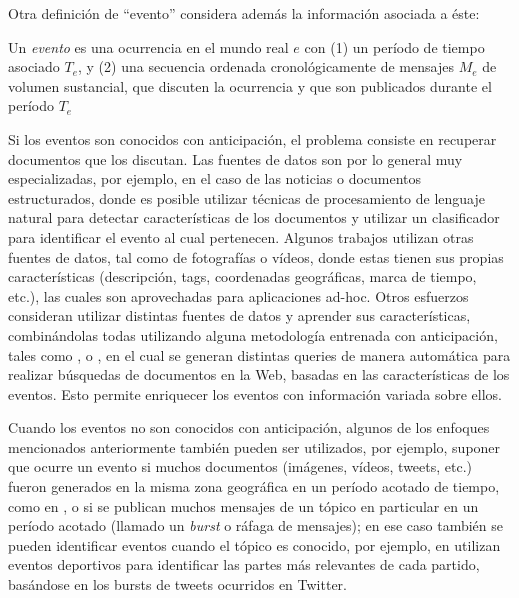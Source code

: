    Otra definición de ``evento'' considera además la información
   asociada a éste\cite{allan2002topic}:

   \begin{defn} Un \emph{evento} es una ocurrencia en el mundo real $e$ con
   (1) un período de tiempo asociado $T_e$, y (2) una secuencia
   ordenada cronológicamente de mensajes $M_e$ de volumen sustancial,
   que discuten la ocurrencia y que son publicados durante el período
   $T_e$ \end{defn}

   Si los eventos son conocidos con anticipación, el problema consiste
   en recuperar documentos que los discutan. Las fuentes de datos son
   por lo general muy especializadas, por ejemplo, en el caso de las
   noticias\cite{Diakopoulos:2012:FAS:2208276.2208409} o documentos
   estructurados, donde es posible utilizar técnicas de procesamiento
   de lenguaje natural para detectar características de los documentos
   y utilizar un clasificador para identificar el evento al cual
   pertenecen. Algunos trabajos utilizan otras fuentes de datos, tal
   como de fotografías o vídeos, donde estas tienen sus propias
   características (descripción, tags, coordenadas geográficas,
   marca de tiempo, etc.), las cuales son aprovechadas para
   aplicaciones ad-hoc\cite{Liu:2011:USM:2072609.2072613}. Otros
   esfuerzos consideran utilizar distintas fuentes de datos y aprender
   sus características, combinándolas todas utilizando alguna
   metodología entrenada con anticipación, tales como
   \cite{Becker:2010:LSM:1718487.1718524}, o
   \cite{Becker:2012:ICP:2124295.2124360}, en el cual se generan
   distintas queries de manera automática para realizar búsquedas de
   documentos en la Web, basadas en las características de los
   eventos. Esto permite  enriquecer los  eventos con información
   variada sobre ellos.

   Cuando los eventos no son conocidos con anticipación, algunos de
   los enfoques mencionados anteriormente también pueden ser
   utilizados, por ejemplo, suponer que ocurre un evento si muchos
   documentos (imágenes, vídeos, tweets, etc.) fueron generados en la
   misma zona geográfica en un período acotado de tiempo, como en
   \cite{Liu:2011:USM:2072609.2072613}, o si se publican muchos
   mensajes de un tópico en particular en un período acotado (llamado
   un \emph{burst} o ráfaga de mensajes); en ese caso también se pueden
   identificar eventos cuando el tópico es conocido, por ejemplo, en
   \cite{chakrabarti2011event} utilizan eventos deportivos para
   identificar las partes más relevantes de cada partido, basándose en
   los bursts de tweets ocurridos en Twitter.


